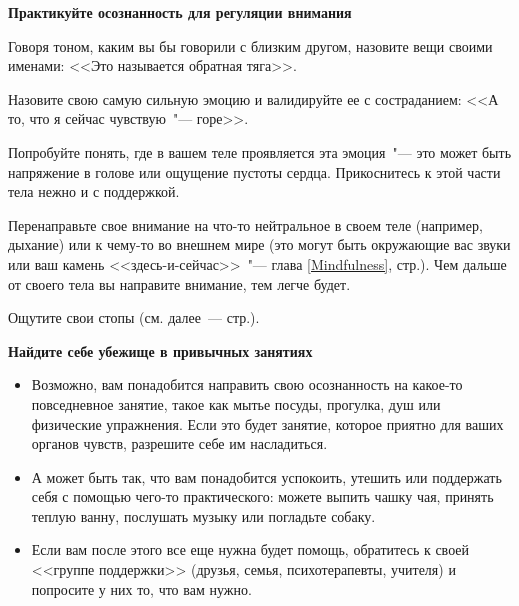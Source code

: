 \textbf{Практикуйте осознанность для регуляции внимания}
\begin{itemize}
	\itemdiamondsuit Говоря тоном, каким вы бы говорили с близким другом, назовите вещи своими именами: <<Это называется обратная тяга>>.
	
	\itemdiamondsuit Назовите свою самую сильную эмоцию и валидируйте ее с состраданием: <<А то, что я сейчас чувствую~"--- горе>>.
	
	\itemdiamondsuit Попробуйте понять, где в вашем теле проявляется эта эмоция~"--- это может быть напряжение в голове или ощущение пустоты сердца. Прикоснитесь к этой части тела нежно и с поддержкой.
	
	\itemdiamondsuit Перенаправьте свое внимание на что-то нейтральное в своем теле (например, дыхание) или к чему-то во внешнем мире (это могут быть окружающие вас звуки или ваш камень <<здесь-и-сейчас>>~"--- глава \ref{Mindfulness}, стр.\:\pageref{IP:Here-and-now_stone}). Чем дальше от своего тела вы направите внимание, тем легче будет.
	
	\itemdiamondsuit Ощутите свои стопы (см. далее~--- стр.\:\pageref{IP:Feeling_the_Soles_of_Your_Feet}).
\end{itemize}

\vspace{2ex}

\textbf{Найдите себе убежище в привычных занятиях}
\begin{itemize}
	\item Возможно, вам понадобится направить свою осознанность на какое-то повседневное занятие, такое как мытье посуды, прогулка, душ или физические упражнения. Если это будет занятие, которое приятно для ваших органов чувств, разрешите себе им насладиться.

	\item А может быть так, что вам понадобится успокоить, утешить или поддержать себя с помощью чего-то практического: можете выпить чашку чая, принять теплую ванну, послушать музыку или погладьте собаку.

	\item Если вам после этого все еще нужна будет помощь, обратитесь к своей <<группе поддержки>> (друзья, семья, психотерапевты, учителя) и попросите у них то, что вам нужно.
\end{itemize}

